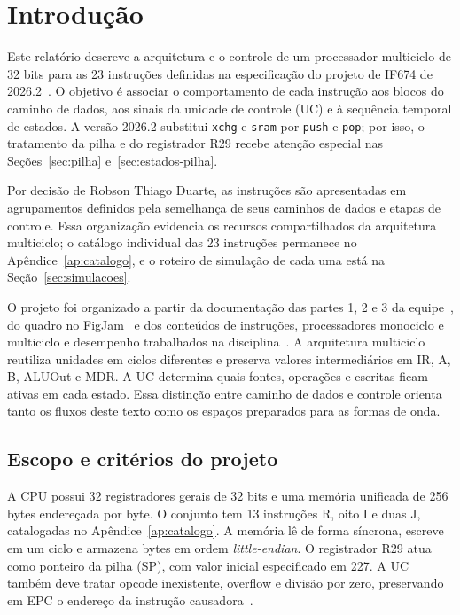 \section{Introdução}\label{sec:introducao}

Este relatório descreve a arquitetura e o controle de um processador multiciclo de 32 bits para as 23 instruções definidas na especificação do projeto de IF674 de 2026.2~\cite{especificacao}. O objetivo é associar o comportamento de cada instrução aos blocos do caminho de dados, aos sinais da unidade de controle (UC) e à sequência temporal de estados. A versão 2026.2 substitui \texttt{xchg} e \texttt{sram} por \texttt{push} e \texttt{pop}; por isso, o tratamento da pilha e do registrador R29 recebe atenção especial nas Seções~\ref{sec:pilha} e~\ref{sec:estados-pilha}.

Por decisão de Robson Thiago Duarte, as instruções são apresentadas em agrupamentos definidos pela semelhança de seus caminhos de dados e etapas de controle. Essa organização evidencia os recursos compartilhados da arquitetura multiciclo; o catálogo individual das 23 instruções permanece no Apêndice~\ref{ap:catalogo}, e o roteiro de simulação de cada uma está na Seção~\ref{sec:simulacoes}.

O projeto foi organizado a partir da documentação das partes 1, 2 e 3 da equipe~\cite{docpt1,docpt2,docpt3}, do quadro no FigJam~\cite{figma} e dos conteúdos de instruções, processadores monociclo e multiciclo e desempenho trabalhados na disciplina~\cite{aulas}. A arquitetura multiciclo reutiliza unidades em ciclos diferentes e preserva valores intermediários em IR, A, B, ALUOut e MDR. A UC determina quais fontes, operações e escritas ficam ativas em cada estado. Essa distinção entre caminho de dados e controle orienta tanto os fluxos deste texto como os espaços preparados para as formas de onda.

\subsection{Escopo e critérios do projeto}\label{subsec:escopo}

A CPU possui 32 registradores gerais de 32 bits e uma memória unificada de 256 bytes endereçada por byte. O conjunto tem 13 instruções R, oito I e duas J, catalogadas no Apêndice~\ref{ap:catalogo}. A memória lê de forma síncrona, escreve em um ciclo e armazena bytes em ordem \emph{little-endian}. O registrador R29 atua como ponteiro da pilha (SP), com valor inicial especificado em 227. A UC também deve tratar opcode inexistente, overflow e divisão por zero, preservando em EPC o endereço da instrução causadora~\cite{especificacao}.

